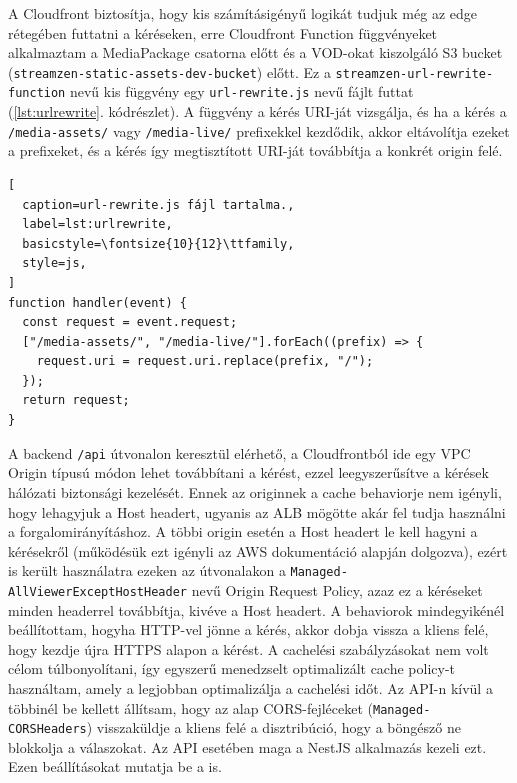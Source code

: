 A Cloudfront biztosítja, hogy kis számításigényű logikát tudjuk még az edge rétegében futtatni a kéréseken, erre Cloudfront Function függvényeket alkalmaztam a MediaPackage csatorna előtt és a VOD-okat kiszolgáló S3 bucket (\verb|streamzen-static-assets-dev-bucket|) előtt. Ez a \verb|streamzen-url-rewrite-function| nevű kis függvény egy \verb|url-rewrite.js| nevű fájlt futtat (\ref{lst:urlrewrite}. kódrészlet). A függvény a kérés URI-ját vizsgálja, és ha a kérés a \verb|/media-assets/| vagy \verb|/media-live/| prefixekkel kezdődik, akkor eltávolítja ezeket a prefixeket, és a kérés így megtisztított URI-ját továbbítja a konkrét origin felé.

\begin{minipage}{0.92\textwidth}
  \begin{lstlisting}[
  caption=url-rewrite.js fájl tartalma.,
  label=lst:urlrewrite,
  basicstyle=\fontsize{10}{12}\ttfamily,
  style=js,
]
function handler(event) {
  const request = event.request;
  ["/media-assets/", "/media-live/"].forEach((prefix) => {
    request.uri = request.uri.replace(prefix, "/");
  });
  return request;
}
\end{lstlisting}
\end{minipage}

A backend \verb|/api| útvonalon keresztül elérhető, a Cloudfrontból ide egy VPC Origin típusú módon lehet továbbítani a kérést, ezzel leegyszerűsítve a kérések hálózati biztonsági kezelését. Ennek az originnek a cache behaviorje nem igényli, hogy lehagyjuk a Host headert, ugyanis az ALB mögötte akár fel tudja használni a forgalomirányításhoz. A többi origin esetén a Host headert le kell hagyni a kérésekről (működésük ezt igényli az AWS dokumentáció alapján dolgozva), ezért is került használatra ezeken az útvonalakon a \verb|Managed-AllViewerExceptHostHeader| nevű Origin Request Policy, azaz ez a kéréseket minden headerrel továbbítja, kivéve a Host headert. A behaviorok mindegyikénél beállítottam, hogyha HTTP-vel jönne a kérés, akkor dobja vissza a kliens felé, hogy kezdje újra HTTPS alapon a kérést. A cachelési szabályzásokat nem volt célom túlbonyolítani, így egyszerű menedzselt optimalizált cache policy-t használtam, amely a legjobban optimalizálja a cachelési időt. Az API-n kívül a többinél be kellett állítsam, hogy az alap CORS-fejléceket (\verb|Managed-CORSHeaders|) visszaküldje a kliens felé a disztribúció, hogy a böngésző ne blokkolja a válaszokat. Az API esetében maga a NestJS alkalmazás kezeli ezt. Ezen beállításokat mutatja be a  is.

